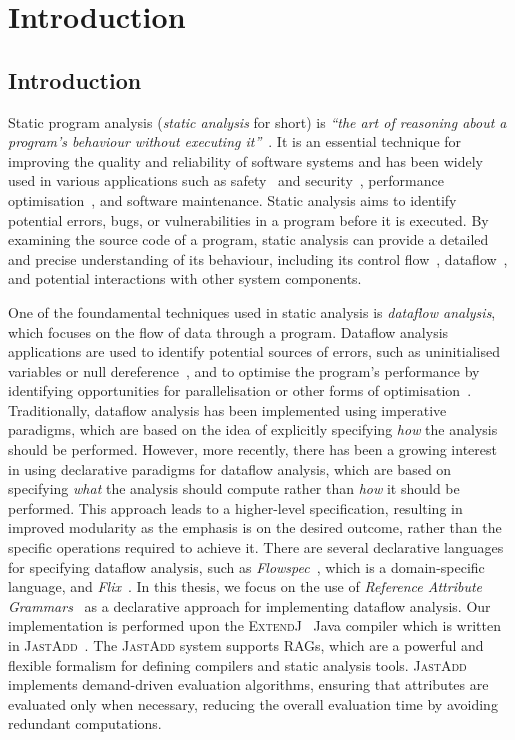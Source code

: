 \chapter{Introduction}
\section{Introduction}

Static program analysis (\emph{static analysis} for short) is
\emph{``the art of reasoning about a program's behaviour without executing it''}~\cite{spa}.
It is an essential technique for improving the quality and reliability of software
systems and has been widely used in various applications such
as safety~\cite{cousot2005astree,Blanchet2002} and security~\cite{piskachev2021secucheck,flowDroid,ayewah2008using,Sayar_2022,fink2012wala},
performance optimisation~\cite{aho2007compilers,appel2004modern}, and software maintenance.
Static analysis aims to identify potential errors, bugs, or vulnerabilities
in a program before it is executed.
By examining the source code of a program, static
analysis can provide a detailed and precise understanding of its behaviour, including
its control flow~\cite{allen1970control}, dataflow~\cite{kam1977monotone},
and potential interactions with other system components.



One of the foundamental techniques used in static analysis is \emph{dataflow analysis},
which focuses on the flow of data through a program. Dataflow analysis applications are used to identify
potential sources of errors, such as uninitialised variables or null dereference~\cite{khedker2017data},
and to optimise the program's performance by identifying opportunities for
parallelisation or other forms of optimisation~\cite{aho2007compilers}.
Traditionally, dataflow analysis has been implemented using imperative paradigms,
which are based on the idea of explicitly specifying \emph{how} the analysis should be
performed.
However, more recently, there has been a growing interest in using
declarative paradigms for dataflow analysis, which are based on specifying \emph{what}
the analysis should compute rather than \emph{how} it should be performed.
This approach leads to a higher-level specification, resulting in improved modularity as
the emphasis is on the desired outcome, rather than the specific operations required to 
achieve it.
There are several declarative languages for specifying dataflow analysis, 
such as \emph{Flowspec}~\cite{smits2020flowspec}, which is a domain-specific language,
and \emph{Flix}~\cite{madsen2016programming}. In this thesis, we focus on the use of \emph{Reference 
Attribute Grammars}~\cite{hedin2000rags} as a declarative approach for implementing dataflow analysis. 
Our implementation is performed upon the \textsc{ExtendJ}~\cite{ekman2007jastadd} Java compiler
which is written in \textsc{JastAdd}~\cite{DBLP:journals/entcs/HedinM01}.
The \textsc{JastAdd} system supports RAGs, which are a powerful and flexible
formalism for defining compilers and static analysis tools. 
\textsc{JastAdd} implements demand-driven evaluation algorithms, ensuring that attributes are evaluated only 
when necessary, reducing the overall evaluation time by avoiding redundant
computations.

